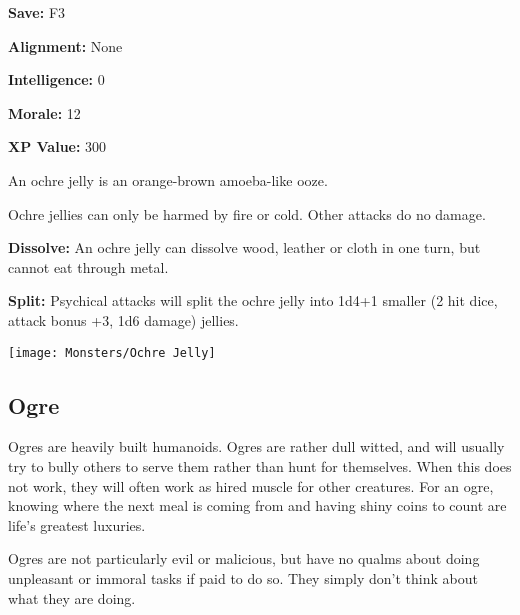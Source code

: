 \begin{multicols*}{2}
{\textbf{Save:} F3

\textbf{Alignment:} None

\textbf{Intelligence:} 0

\textbf{Morale:} 12

\textbf{XP Value:} 300}

An ochre jelly is an orange-brown amoeba-like ooze.

Ochre jellies can only be harmed by fire or cold. Other attacks do no damage.

\textbf{Dissolve:} An ochre jelly can dissolve wood, leather or cloth in one turn, but cannot eat through metal.

\textbf{Split:} Psychical attacks will split the ochre jelly into 1d4+1 smaller (2 hit dice, attack bonus +3, 1d6 damage) jellies.

\texttt{[image: Monsters/Ochre Jelly]}

\subsection{Ogre}

Ogres are heavily built humanoids. Ogres are rather dull witted, and will usually try to bully others to serve them rather than hunt for themselves. When this does not work, they will often work as hired muscle for other creatures. For an ogre, knowing where the next meal is coming from and having shiny coins to count are life’s greatest luxuries.

Ogres are not particularly evil or malicious, but have no qualms about doing unpleasant or immoral tasks if paid to do so. They simply don’t think about what they are doing.


\end{multicols*}
